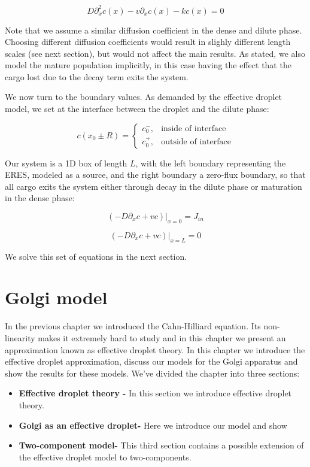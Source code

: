 \documentclass[12pt,a4paper,]{Dissertate}
\providecommand{\tightlist}{%
  \setlength{\itemsep}{0pt}\setlength{\parskip}{0pt}}
\begin{document}
\begin{equation}
D\partial_x^2 c(x) - v\partial_xc(x)-kc(x)=0
\label{eq:coutside}\end{equation}

Note that we assume a similar diffusion coefficient in the dense and
dilute phase. Choosing different diffusion coefficients would result in
slighly different length scales (see next section), but would not affect
the main results. As stated, we also model the mature population
implicitly, in this case having the effect that the cargo lost due to
the decay term exits the system.

We now turn to the boundary values. As demanded by the effective droplet
model, we set at the interface between the droplet and the dilute phase:

\[
c(x_0\pm R)=
\begin{cases}
    c_0^-,& \text{inside of interface}\\
    c_0^+,& \text{outside of interface}
\end{cases}
\]

Our system is a 1D box of length \(L\), with the left boundary
representing the ERES, modeled as a source, and the right boundary a
zero-flux boundary, so that all cargo exits the system either through
decay in the dilute phase or maturation in the dense phase:

\[
(-D\partial_xc+vc)|_{x=0} = J_{in}
\]

\[
(-D\partial_xc+vc)|_{x=L} = 0
\]

We solve this set of equations in the next section.

\hypertarget{golgi-model}{%
\chapter{Golgi model}\label{golgi-model}}

In the previous chapter we introduced the Cahn-Hilliard equation. Its
non-linearity makes it extremely hard to study and in this chapter we
present an approximation known as effective droplet theory. In this
chapter we introduce the effective droplet approximation, discuss our
models for the Golgi apparatus and show the results for these models.
We've divided the chapter into three sections:

\begin{itemize}
\tightlist
\item
  \textbf{Effective droplet theory -} In this section we introduce
  effective droplet theory.
\item
  \textbf{Golgi as an effective droplet-} Here we introduce our model
  and show
\item
  \textbf{Two-component model-} This third section contains a possible
  extension of the effective droplet model to two-components.
\end{itemize}
\end{document}
